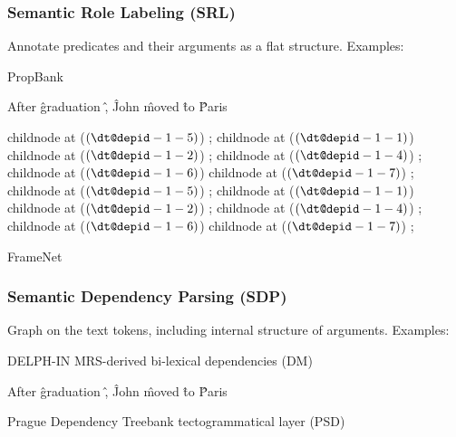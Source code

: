\documentclass[t]{beamer}
\begin{document}
\begin{frame}
\frametitle{Semantic Role Labeling (SRL)}
Annotate predicates and their arguments as a flat structure.
Examples:

\centering
\vfill
{\color{blue} PropBank}
\vfill

\begin{dependency}
	\begin{deptext}[column sep=1.5em,ampersand replacement=\^]
	After \^ graduation \^ , \^ John \^ moved \^ to \^ Paris \\
	\end{deptext}
	child{node at ($(\wordref{1}{5})$) {}};
	child{node at ($(\wordref{1}{1})$) {}}
	child{node at ($(\wordref{1}{2})$) {}};
	child{node at ($(\wordref{1}{4})$) {}};
	child{node at ($(\wordref{1}{6})$) {}}
	child{node at ($(\wordref{1}{7})$) {}};
	child{node at ($(\wordref{1}{5})$) {}};
	child{node at ($(\wordref{1}{1})$) {}}
	child{node at ($(\wordref{1}{2})$) {}};
	child{node at ($(\wordref{1}{4})$) {}};
	child{node at ($(\wordref{1}{6})$) {}}
	child{node at ($(\wordref{1}{7})$) {}};
\end{dependency}

\vfill
{\color{red} FrameNet}
\end{frame}

\begin{frame}
\frametitle{Semantic Dependency Parsing (SDP)}
Graph on the text tokens, including internal structure of arguments.
Examples:

\centering
\vfill
{\color{blue} DELPH-IN MRS-derived bi-lexical dependencies (DM)}
\vfill

\begin{dependency}[theme=simple]
	\begin{deptext}[column sep=1.5em,ampersand replacement=\^]
	After \^ graduation \^ , \^ John \^ moved \^ to \^ Paris \\
	\end{deptext}
\end{dependency}

\vfill
{\color{red} Prague Dependency Treebank tectogrammatical layer (PSD)}
\end{frame}
\end{document}
